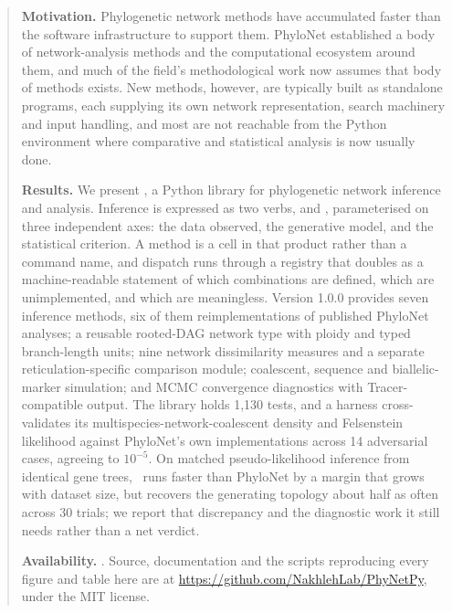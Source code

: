 \begin{abstract}
\noindent
\textbf{Motivation.} Phylogenetic network methods have accumulated faster than
the software infrastructure to support them. PhyloNet established a body of
network-analysis methods and the computational ecosystem around them, and much
of the field's methodological work now assumes that body of methods exists. New
methods, however, are typically built as standalone programs, each supplying its
own network representation, search machinery and input handling, and most are not
reachable from the Python environment where comparative and statistical analysis
is now usually done.

\noindent
\textbf{Results.} We present \phynetpy, a Python library for phylogenetic network
inference and analysis. Inference is expressed as two verbs,  and
, parameterised on three independent axes: the data observed, the
generative model, and the statistical criterion. A method is a cell in that
product rather than a command name, and dispatch runs through a registry that
doubles as a machine-readable statement of which combinations are defined,
which are unimplemented, and which are meaningless. Version 1.0.0 provides seven
inference methods, six of them reimplementations of published PhyloNet analyses;
a reusable rooted-DAG network type with ploidy and typed branch-length units;
nine network dissimilarity measures and a separate reticulation-specific
comparison module; coalescent, sequence and biallelic-marker simulation; and
MCMC convergence diagnostics with Tracer-compatible output. The library holds
1{,}130 tests, and a harness cross-validates its multispecies-network-coalescent
density and Felsenstein likelihood against PhyloNet's own implementations across
14 adversarial cases, agreeing to $10^{-5}$. On matched pseudo-likelihood
inference from identical gene trees, \phynetpy\ runs faster than PhyloNet by a
margin that grows with dataset size, but recovers the generating topology about
half as often across 30 trials; we report that discrepancy and the diagnostic
work it still needs rather than a net verdict.

\noindent
\textbf{Availability.} . Source, documentation and the
scripts reproducing every figure and table here are at
\url{https://github.com/NakhlehLab/PhyNetPy}, under the MIT license.
\end{abstract}
